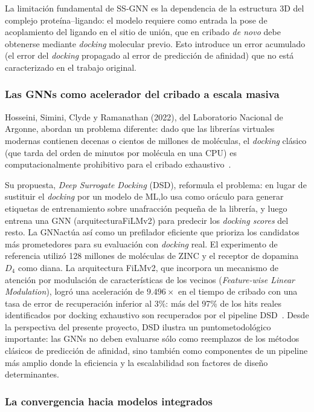 La limitación fundamental de SS-GNN es la dependencia de la estructura 3D del complejo proteína--ligando: el modelo requiere como entrada la pose de acoplamiento del ligando en el sitio de unión, que en cribado \textit{de novo} debe obtenerse mediante \emph{docking} molecular previo. Esto introduce un error acumulado (el error del \emph{docking} propagado al error de predicción de afinidad) que no está caracterizado en el trabajo original.



\subsubsection{Las GNNs como acelerador  del cribado a escala masiva}
 
Hosseini, Simini, Clyde y Ramanathan (2022), del Laboratorio Nacional de Argonne, abordan un problema diferente: dado que las librerías virtuales modernas contienen decenas o cientos de millones de moléculas, el \emph{docking} clásico (que tarda del orden de minutos por molécula en una CPU) es computacionalmente prohibitivo para el cribado exhaustivo~\cite{hosseini_deep_2022}.
 
Su propuesta, \textit{Deep Surrogate Docking} (DSD), reformula el problema: en lugar de sustituir el \emph{docking} por un modelo de ML,lo usa como oráculo para generar etiquetas de entrenamiento sobre unafracción pequeña de la librería, y luego entrena una GNN (arquitecturaFiLMv2) para predecir los \textit{docking scores} del resto. La GNNactúa así como un prefilador eficiente que prioriza los candidatos más prometedores para su evaluación con \emph{docking} real. El experimento de referencia utilizó 128 millones de moléculas de ZINC y el receptor de dopamina $D_4$ como diana. La arquitectura FiLMv2, que incorpora un mecanismo de atención por modulación de características de los vecinos (\textit{Feature-wise Linear Modulation}), logró una aceleración de $9.496\times$ en el tiempo de cribado con una tasa de error de recuperación inferior al 3\%: más del 97\% de los hits reales identificados por docking exhaustivo son recuperados por el pipeline DSD~\cite{hosseini_deep_2022}. Desde la perspectiva del presente proyecto, DSD ilustra un puntometodológico importante: las GNNs no deben evaluarse sólo como reemplazos de los métodos clásicos de predicción de afinidad, sino también como componentes de un pipeline más amplio donde la eficiencia y la escalabilidad son factores de diseño determinantes.
 
\subsubsection{La convergencia hacia modelos integrados}
 
